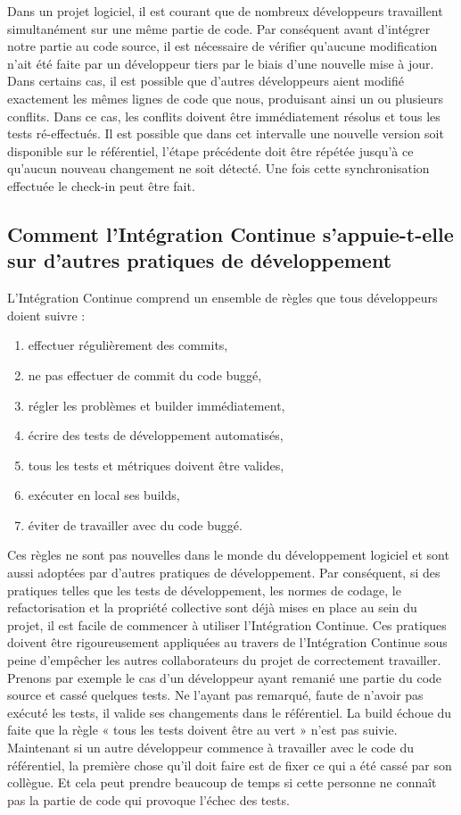     Dans un projet logiciel, il est courant que de nombreux développeurs travaillent simultanément sur une même partie de code.  Par conséquent avant d’intégrer notre partie au code source, il est nécessaire de vérifier qu’aucune modification n’ait été faite par un développeur tiers par le biais d’une nouvelle mise à jour. Dans certains cas, il est possible que d’autres développeurs aient modifié exactement les mêmes lignes de code que nous, produisant ainsi un ou plusieurs conflits. Dans ce cas, les conflits doivent être immédiatement résolus et tous les tests ré-effectués. Il est possible que dans cet intervalle une nouvelle version soit disponible sur le référentiel, l'étape précédente doit être répétée jusqu'à ce qu'aucun nouveau changement ne soit détecté. Une fois cette synchronisation effectuée le check-in peut être fait.

    \subsection{Comment l’Intégration Continue s’appuie-t-elle sur d’autres pratiques de développement}\label{Developers}
    L’Intégration Continue comprend un ensemble de règles que tous développeurs doient suivre :

    \begin{enumerate}
      \item effectuer régulièrement des commits,
      \item ne pas effectuer de commit du code buggé,
      \item régler les problèmes et builder immédiatement,
      \item écrire des tests de développement automatisés,
      \item tous les tests et métriques doivent être valides,
      \item exécuter en local ses builds,
      \item éviter de travailler avec du code buggé.\\
    \end{enumerate}

    Ces règles ne sont pas nouvelles dans le monde du développement logiciel et sont aussi adoptées par d'autres pratiques de développement. Par conséquent, si des pratiques telles que les tests de développement, les normes de codage, le refactorisation et la propriété collective sont déjà mises en place au sein du projet, il est facile de commencer à utiliser l’Intégration Continue. Ces pratiques doivent être rigoureusement appliquées au travers de l’Intégration Continue sous peine d’empêcher les autres collaborateurs du projet de correctement travailler. Prenons par exemple le cas d’un développeur ayant remanié une partie du code source et cassé quelques tests. Ne l’ayant pas remarqué, faute de n’avoir pas exécuté les tests, il valide ses changements dans le référentiel. La build échoue du faite que la règle « tous les tests doivent être au vert » n’est pas suivie. Maintenant si un autre développeur commence à travailler avec le code du référentiel, la première chose qu'il doit faire est de fixer ce qui a été cassé par son collègue. Et cela peut prendre beaucoup de temps si cette personne ne connaît pas la partie de code qui provoque l’échec des tests.

